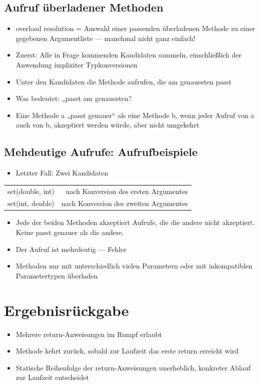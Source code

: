 \subsection{Aufruf überladener Methoden}
\begin{itemize}
\item overload resolution = Auswahl einer passenden überladenen Methode zu einer gegebenen Argumentliste — manchmal nicht ganz einfach!
\item Zuerst: Alle in Frage kommenden Kandidaten sammeln, einschließlich der Anwendung impliziter Typkonversionen
\item Unter den Kandidaten die Methode aufrufen, die am genauesten passt
\item Was bedeutet: „passt am genauesten?
\item Eine Methode a „passt genauer“ als eine Methode b, wenn jeder Aufruf von a auch von b, akzeptiert werden würde, aber nicht umgekehrt
\end{itemize}

\subsection{Mehdeutige Aufrufe: Aufrufbeispiele}
\begin{itemize}
	\item Letzter Fall: Zwei Kandidaten
\end{itemize}
\begin{tabular}{lr}
set(double, int) & nach Konversion des ersten Argumentes \\
set(int, double) & nach Konversion des zweiten Argumentes
\end{tabular}
\begin{itemize}
\item Jede der beiden Methoden akzeptiert Aufrufe, die die andere nicht akzeptiert. Keine passt genauer als die andere.
\item Der Aufruf ist mehrdeutig — Fehler
\item Methoden nur mit unterschiedlich vielen Parametern oder mit inkompatiblen Parametertypen überladen
\end{itemize}
%
%
%
\section{Ergebnisrückgabe}
\begin{itemize}
\item Mehrere return-Anweisungen im Rumpf erlaubt
\item Methode kehrt zurück, sobald zur Laufzeit das erste return erreicht wird
\item Statische Reihenfolge der return-Anweisungen unerheblich, konkreter Ablauf zur Laufzeit entscheidet
\end{itemize}

